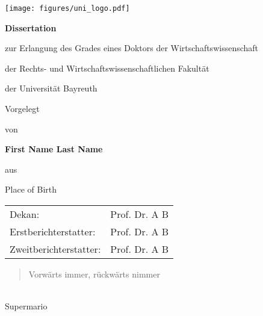 \begin{titlepage}
  \centering
  \normalsize
  
  \texttt{[image: figures/uni\_logo.pdf]}  
  
  \vspace{3cm}
  
  \Large{\bfseries \disstitle} \par
      
  \vspace{4cm}
      
  \large{\textbf{Dissertation}} \par
  \large{zur Erlangung des Grades eines Doktors der Wirtschaftswissenschaft} \par
  \large{der Rechts- und Wirtschaftswissenschaftlichen Fakultät} \par
  \large{der Universität Bayreuth}\par
  
  
  \vfill
      
  \large{Vorgelegt} \par
  \large{von} \par
  \large{\textbf{First Name Last Name}} \par
  \large{aus} \par
  \large{Place of Birth}\par
  \end{titlepage}
      
      
  \newpage
      
  \thispagestyle{empty}
      
  \mbox{}
      
  \vfill    
  \begin{table*}[h]
  \begin{tabular} {p{8cm} l} 
  Dekan:                          & Prof. Dr. A B \\
  Erstberichterstatter:           & Prof. Dr. A B \\
  Zweitberichterstatter:          & Prof. Dr. A B \\
  \end{tabular}
  \end{table*}
    
  \clearpage
    
  \thispagestyle{empty}
  \begin{center}
      \vspace*{\fill}
      {\Large\blockquote{Vorwärts immer, rückwärts nimmer}} \\
      \vspace{0.5cm}
      {Supermario}
  \vspace*{\fill}
  \end{center}
  
  \clearpage	